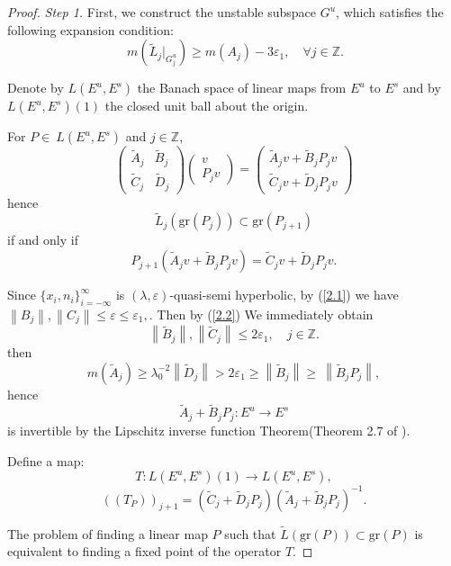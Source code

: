 \documentclass[12pt]{article}
\begin{document}
\begin{proof}{\em Step 1.}
	First, we construct the unstable subspace $G^u$, which satisfies the following expansion condition:
	$$
	\ m(\widetilde{L}_{j}|_{G_{j}^{u}})\geqslant m(A_{j})- 3\varepsilon_1,\quad\forall j\in \mathbb Z.
	$$
	
	Denote by $ L(E^{u},E^{s}) $ the Banach space of linear maps from $ E^{u} $ to $ E^{s} $ and by $ L(E^{u},E^{s})(1) $ the closed unit ball about the origin. 
	
	For  $ P\in\ L(E^{u},E^{s}) $ and  $ j\in \mathbb Z $,
	$$
	\begin{pmatrix}
		\widetilde{A}_{j}&\widetilde{B}_{j}\\
		\widetilde{C}_{j}&\widetilde{D}_{j}
	\end{pmatrix}
	\begin{pmatrix}
		v\\
		P_{j}v
	\end{pmatrix}
	=
	\begin{pmatrix}
		\widetilde{A}_{j}v+\widetilde{B}_{j} P_{j}v\\
		\widetilde{C}_{j}v+\widetilde{D}_{j} P_{j}v
	\end{pmatrix}
	$$
	hence
	$$
	\widetilde{L}_{j}(\text{gr}(P_{j}))\subset \text{gr}(P_{j+1})
	$$
	if and only if
	$$
	P_{j+1}(\widetilde{A}_{j}v+\widetilde{B}_{j} P_{j}v)=\widetilde{C}_{j}v+\widetilde{D}_{j} P_{j}v.
	$$
	
	Since $\{x_{i}, n_{i}\}_{i=-\infty}^{\infty}$ is $(\lambda, \varepsilon)$-quasi-semi hyperbolic, by (\ref{2.1}) we have $ \left\|B_{j}\right\|,\left\|C_{j}\right\|\leqslant \varepsilon\leqslant\varepsilon_1, $. Then by (\ref{2.2}) We immediately obtain
	\begin{equation}\label{2.3}\left\|\widetilde{B}_{j}\right\|,\left\|\widetilde{C}_{j}\right\| \leqslant 2\varepsilon_1, \quad  j \in \mathbb Z.
	\end{equation}
	then
	$$
	m(\widetilde{A}_{j})\geqslant \lambda_{0}^{-2}\left\|\widetilde{D}_{j}\right\|>2\varepsilon_{1}\geqslant\left\|\widetilde{B}_{j}\right\| \geqslant\ \left\|\widetilde{B}_{j}P_{j}\right\|,
	$$
	hence $$  \widetilde{A}_{j}+\widetilde{B}_{j}P_{j}:E^{u}\rightarrow E^{s} $$ is invertible by the Lipschitz inverse function Theorem(Theorem 2.7 of \cite{LW}).
	
	Define a map:
	$$
	T:L(E^{u},E^{s})(1) \rightarrow L(E^{u},E^{s}),
	$$
	$$
	((T_{P}))_{j+1}=(\widetilde{C}_{j}+\widetilde{D}_{j}P_{j})(\widetilde{A}_{j}+\widetilde{B}_{j}P_{j})^{-1}.
	$$
	
	The problem of finding a linear map $ P $ such that $ \widetilde{L}(\text{gr}(P)) \subset \text{gr}(P) $ is equivalent to finding a fixed point of the operator  $ T $.
	

\end{proof}
\end{document}
